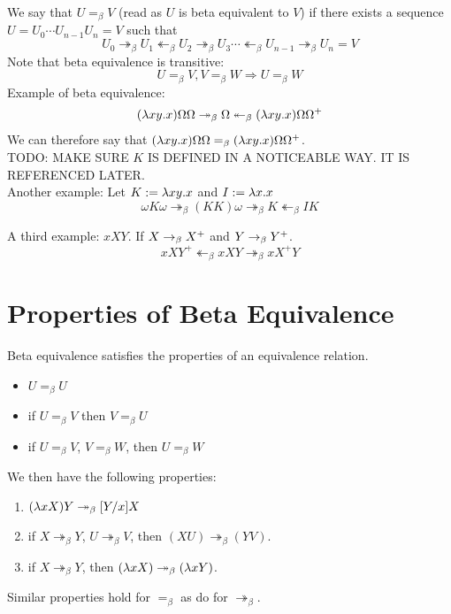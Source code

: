 We say that $U =_\beta V$ (read as $U$ is beta equivalent to $V$) if there exists a sequence $U = U_0 \cdots U_{n-1} U_n = V$ such that
\begin{equation*}
  U_0 \twoheadrightarrow_\beta U_1 \twoheadleftarrow_\beta U_2 \twoheadrightarrow_\beta U_3 \cdots \twoheadleftarrow_\beta U_{n-1} \twoheadrightarrow_\beta U_n = V
\end{equation*}
Note that beta equivalence is transitive:
\begin{equation*}
  U =_\beta V, V =_\beta W \Rightarrow U =_\beta W
\end{equation*}
Example of beta equivalence:
\begin{eqnarray*}
  (\lambda xy.x)\Omega\Omega \twoheadrightarrow_\beta \Omega \twoheadleftarrow_\beta (\lambda xy.x)\Omega\Omega^+
\end{eqnarray*}
We can therefore say that $(\lambda xy.x)\Omega\Omega =_\beta (\lambda xy.x)\Omega\Omega^+$.\\

TODO: MAKE SURE $K$ IS DEFINED IN A NOTICEABLE WAY. IT IS REFERENCED LATER.\\
Another example: Let $K := \lambda xy.x$ and $I := \lambda x.x$
\begin{equation*}
  \omega K \omega \twoheadrightarrow_\beta (KK)\omega \twoheadrightarrow_\beta K \twoheadleftarrow_\beta IK
\end{equation*}

A third example: $xXY$. If $X \rightarrow_\beta X^+$ and $Y \rightarrow_\beta Y^+$.
\begin{equation*}
  xXY^+ \twoheadleftarrow_\beta xXY \twoheadrightarrow_\beta xX^+Y
\end{equation*}

\section{Properties of Beta Equivalence}
Beta equivalence satisfies the properties of an equivalence relation.
\begin{itemize}
  \item $U =_\beta U$
  \item if $U =_\beta V$ then $V =_\beta U$
  \item if $U =_\beta V$, $V =_\beta W$, then $U =_\beta W$
\end{itemize}
We then have the following properties:
\begin{enumerate}
  \item $(\lambda x X)Y \twoheadrightarrow_\beta [Y/x]X$
  \item if $X \twoheadrightarrow_\beta Y$, $U \twoheadrightarrow_\beta V$, then $(XU) \twoheadrightarrow_\beta (YV)$.
  \item if $X \twoheadrightarrow_\beta Y$, then $(\lambda xX) \twoheadrightarrow_\beta (\lambda xY)$.
\end{enumerate}
Similar properties hold for $=_\beta$ as do for $\twoheadrightarrow_\beta$.

